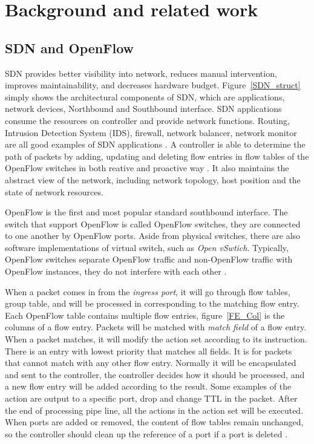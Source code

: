 \chapter{Background and related work}
\section{SDN and OpenFlow}
SDN provides better visibility into network, reduces manual intervention, improves maintainability, and decreases hardware budget. Figure~\ref{SDN_struct} simply shows the architectural components of SDN, which are applications, network devices, Northbound and Southbound interface. SDN applications consume the resources on controller and provide network functions. Routing, Intrusion Detection System (IDS), firewall, network balancer, network monitor are all good examples of SDN applications \cite{SPYFGT13}. A controller is able to determine the path of packets by adding, updating and deleting flow entries in flow tables of the OpenFlow switches in both reative and proactive way \cite{OF_SPEC}. It also maintains the abstract view of the network, including network topology, host position and the state of network resources.

OpenFlow is the first and most popular standard southbound interface. The switch that support OpenFlow is called OpenFlow switches, they are connected to one another by OpenFlow ports. Aside from physical switches, there are also software implementations of virtual switch, such as \textit{Open vSwtich}. Typically, OpenFlow switches separate OpenFlow traffic and non-OpenFlow traffic with OpenFlow instances, they do not interfere with each other \cite{HP_SPEC}.

When a packet comes in from the \textit{ingress port}, it will go through flow tables, group table, and will be processed in corresponding to the matching flow entry. Each OpenFlow table contains multiple flow entries, figure~\ref{FE_Col} is the columns of a flow entry. Packets will be matched with \textit{match field} of a flow entry. When a packet matches, it will modify the action set according to its instruction. There is an entry with lowest priority that matches all fields. It is for packets that cannot match with any other flow entry. Normally it will be encapsulated and sent to the controller, the controller decides how it should be processed, and a new flow entry will be added according to the result. Some examples of the action are output to a specific port, drop and change TTL in the packet. After the end of processing pipe line, all the actions in the action set will be executed. When ports are added or removed, the content of flow tables remain unchanged, so the controller should clean up the reference of a port if a port is deleted \cite{OF_SPEC}.

